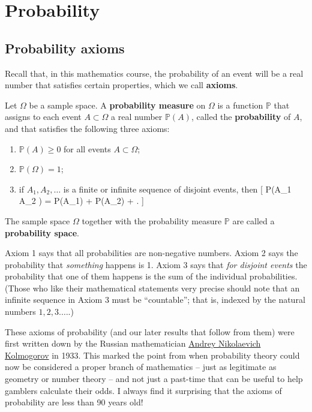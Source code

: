 \documentclass[
  letterpaper,
]{report}
\providecommand{\tightlist}{%
  \setlength{\itemsep}{0pt}\setlength{\parskip}{0pt}}\usepackage{longtable,booktabs,array}
\theoremstyle{definition}
\theoremstyle{definition}
\theoremstyle{remark}
\begin{document}
\hypertarget{L04-probability}{%
\chapter{Probability}\label{L04-probability}}

\hypertarget{axioms}{%
\section{Probability axioms}\label{axioms}}

Recall that, in this mathematics course, the probability of an event
will be a real number that satisfies certain properties, which we call
\textbf{axioms}.

\leavevmode{}%
Let \(\Omega\) be a sample space. A \textbf{probability measure} on
\(\Omega\) is a function \(\mathbb P\) that assigns to each event
\(A \subset \Omega\) a real number \(\mathbb P(A)\), called the
\textbf{probability} of \(A\), and that satisfies the following three
axioms:

\begin{enumerate}
\def\labelenumi{\arabic{enumi}.}
\tightlist
\item
  \(\mathbb P(A) \geq 0\) for all events \(A \subset \Omega\);
\item
  \(\mathbb P(\Omega) = 1\);
\item
  if \(A_1, A_2, \dots\) is a finite or infinite sequence of disjoint
  events, then {[} \mathbb P(A\_1 \cup A\_2 \cup \cdots) =
  \mathbb P(A\_1) + \mathbb P(A\_2) + \cdots . {]}
\end{enumerate}

The sample space \(\Omega\) together with the probability measure
\(\mathbb P\) are called a \textbf{probability space}.

Axiom 1 says that all probabilities are non-negative numbers. Axiom 2
says the probability that \emph{something} happens is 1. Axiom 3 says
that \emph{for disjoint events} the probability that one of them happens
is the sum of the individual probabilities. (Those who like their
mathematical statements very precise should note that an infinite
sequence in Axiom 3 must be ``countable''; that is, indexed by the
natural numbers \(1, 2, 3. \dots\).)

These axioms of probability (and our later results that follow from
them) were first written down by the Russian mathematician
\href{https://mathshistory.st-andrews.ac.uk/Biographies/Kolmogorov/}{Andrey
Nikolaevich Kolmogorov} in 1933. This marked the point from when
probability theory could now be considered a proper branch of
mathematics -- just as legitimate as geometry or number theory -- and
not just a past-time that can be useful to help gamblers calculate their
odds. I always find it surprising that the axioms of probability are
less than 90 years old!
\end{document}
